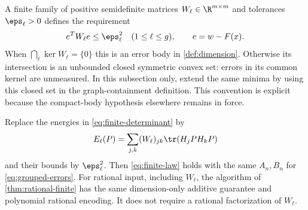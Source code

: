 A finite family of positive semidefinite matrices $W_\ell\in\R^{m\times m}$
and tolerances $\eps_\ell>0$ defines the requirement
\begin{equation}\label{eq:grouped-errors}
 e^TW_\ell e\le\eps_\ell^2\quad(1\le\ell\le g),
 \qquad e=w-F(x).
\end{equation}
When $\bigcap_\ell\ker W_\ell=\{0\}$ this is an error body in
\cref{def:dimension}. Otherwise its intersection is an unbounded closed
symmetric convex set: errors in its common kernel are unmeasured. In this
subsection only, extend the same minima by using this closed set in the
graph-containment definition. This convention is explicit because the
compact-body hypothesis elsewhere remains in force.

\begin{theorem}\label{thm:grouped-covariance}
Replace the energies in \eqref{eq:finite-determinant} by
\[
 E_\ell(P)=\sum_{j,k}(W_\ell)_{jk}\tr(H_jPH_kP)
\]
and their bounds by $\eps_\ell^2$. Then \eqref{eq:finite-law} holds with
the same $A_n,B_n$ for \eqref{eq:grouped-errors}. For rational input,
including $W_\ell$, the algorithm of \cref{thm:rational-finite} has the
same dimension-only additive guarantee and polynomial rational encoding.
It does not require a rational factorization of $W_\ell$.
\end{theorem}
